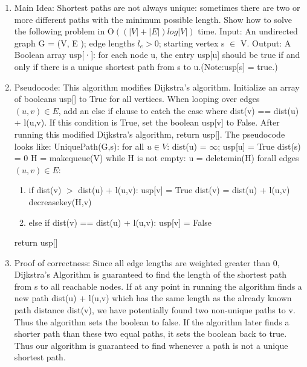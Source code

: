 \documentclass[11pt]{article}
\begin{document}
\begin{enumerate}
\item Main Idea:
Shortest paths are not always unique: sometimes there are two or more different paths with the minimum possible length. Show how to solve the following problem in O$((|V | + |E |) log |V |)$ time.\newline
Input: An undirected graph G = (V, E ); edge lengths $l_e > 0$; starting vertex s $\in$ V.\newline
Output: A Boolean array usp[·]: for each node u, the entry usp[u] should be true if and only if there
is a unique shortest path from s to u.(Note:usp[s] = true.)
\item Pseudocode: This algorithm modifies Dijkstra's algorithm. Initialize an array of booleans usp[] to True for all vertices. When looping over edges $(u,v)\in E$, add an else if clause to catch the case where dist(v) == dist(u) + l(u,v). If this condition is True, set the boolean usp[v] to False. After running this modified Dijkstra's algorithm, return usp[]. The pseudocode looks like:\newline
UniquePath(G,s):\newline
for all $u \in V$: dist(u) = $\infty$; usp[u] = True\newline
dist(s) = 0\newline
H = makequeue(V)\newline
while H is not empty:\newline
  u = deletemin(H)\newline
  forall edges $(u,v) \in E$:
    \begin{enumerate}
    \item if dist(v) $>$ dist(u) + l(u,v):\newline
      usp[v] = True
      dist(v) = dist(u) + l(u,v)\newline
      decreasekey(H,v)\newline
    \item else if dist(v) == dist(u) + l(u,v):\newline
      usp[v] = False
    \end{enumerate}
return usp[]\newline
\item Proof of correctness: Since all edge lengths are weighted greater than 0, Dijkstra's Algorithm is guaranteed to find the length of the shortest path from s to all reachable nodes. If at any point in running the algorithm finds a new path dist(u) + l(u,v) which has the same length as the already known path distance dist(v), we have potentially found two non-unique paths to v. Thus the algorithm sets the boolean to false. If the algorithm later finds a shorter path than these two equal paths, it sets the boolean back to true. Thus our algorithm is guaranteed to find whenever a path is not a unique shortest path.

\end{enumerate}
\end{document}
